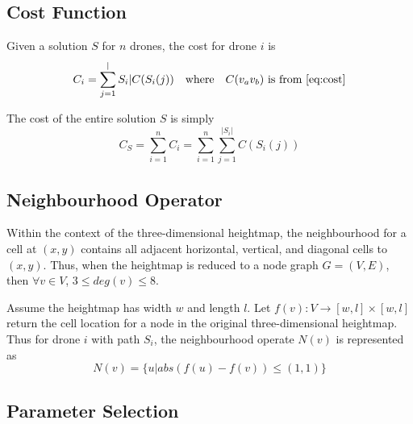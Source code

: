 \documentclass[conference]{IEEEtran}
\begin{document}
\subsection{Cost Function}
Given a solution $S$ for $n$ drones, the cost for drone $i$ is 
\begin{equation} \label{eq:costdrone}
C_i = \sum_{j=1}^|S_i| C(S_i(j)) \quad \text{where} \quad C(v_av_b) \text{ is from \ref{eq:cost}}
\end{equation}

The cost of the entire solution $S$ is simply
\begin{equation} \label{eq:costsolution}
C_S = \sum_{i=1}^n C_i = \sum_{i=1}^n \sum_{j=1}^|S_i| C(S_i(j))
\end{equation}

\subsection{Neighbourhood Operator}
Within the context of the three-dimensional heightmap, the neighbourhood for a cell at $(x, y)$ contains all adjacent horizontal, vertical, and diagonal cells to $(x, y)$. Thus, when the heightmap is reduced to a node graph $G = (V, E)$, then $\forall v \in V$, $3 \leq deg(v) \leq 8$.

Assume the heightmap has width $w$ and length $l$. Let $f(v) : V \rightarrow [w, l] \times [w, l]$ return the cell location for a node in the original three-dimensional heightmap. Thus for drone $i$ with path $S_i$, the neighbourhood operate $N(v)$ is represented as
\begin{equation} \label{eq:neighbourhood}
N(v) = \{ u | abs(f(u) - f(v)) \leq (1, 1) \}
\end{equation}


\subsection{Parameter Selection}
\end{document}
